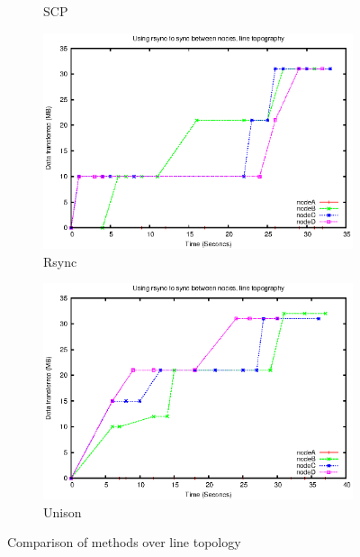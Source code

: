 \documentclass[12pt]{article}
\begin{document}
\begin{figure}[htp]
\begin{subfigure}[b]{0.5\linewidth}
        \caption{SCP}
        \label{fig:line_scp}
    \end{subfigure}

    \begin{subfigure}[b]{0.5\linewidth}
        \centering
        \includegraphics[scale=0.5]{images/line-rsync-10-fixes.eps}
        \caption{Rsync}
        \label{fig:line_rsync}
    \end{subfigure}
    \begin{subfigure}[b]{0.5\linewidth}
        \centering
        \includegraphics[scale=0.5]{images/line-uni-10-fixes.eps}
        \caption{Unison}
        \label{fig:line_uni}
    \end{subfigure}
    \caption{Comparison of methods over line topology}
\end{figure}
\end{document}
